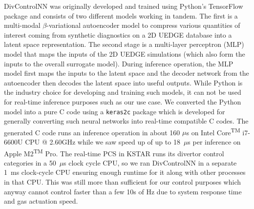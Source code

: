 \documentclass[10pt]{iopart}
\begin{document}
DivControlNN was originally developed and trained using Python's TensorFlow package and consists of two different models working in tandem.
The first is a multi-modal $\beta$-variational autoencoder \cite{Higgins_2017_ICLR} model to compress various quantities of interest coming from synthetic diagnostics on a 2D UEDGE database into a latent space representation.
The second stage is a multi-layer perceptron (MLP) model that maps the inputs of the 2D UEDGE simulations (which also form the inputs to the overall surrogate model).
During inference operation, the MLP model first maps the inputs to the latent space and the decoder network from the autoencoder then decodes the latent space into useful outputs.
While Python is the industry choice for developing and training such models, it can not be used for real-time inference purposes such as our use case.
We converted the Python model into a pure C code using a \texttt{keras2c} \cite{keras2c} package which is developed for generally converting such neural networks into real-time compatible C codes.
The generated C code runs an inference operation in about 160 $\mu$s on Intel\textsuperscript{\textregistered} Core\textsuperscript{TM} i7-6600U CPU @ 2.60GHz while we saw speed up of up to 18~$\mu$s per inference on Apple\textsuperscript{\textregistered} M2\textsuperscript{TM} Pro.
The real-time PCS in KSTAR runs its divertor control categories in a 50~$\mu$s clock cycle CPU, so we ran DivControlNN in a separate 1~ms clock-cycle CPU ensuring enough runtime for it along with other processes in that CPU.
This was still more than sufficient for our control purposes which anyway cannot control faster than a few 10s of Hz due to system response time and gas actuation speed.
\end{document}
